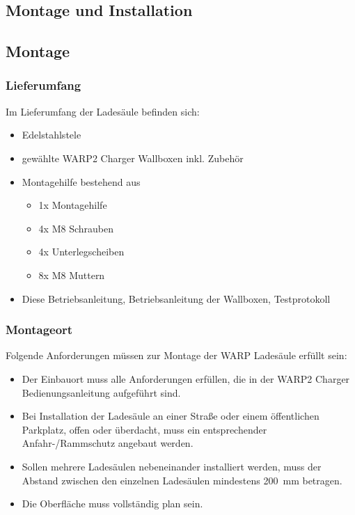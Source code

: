 \documentclass[a4paper,10pt]{article}
\begin{document}
\begin{multicols*}{2}
	\section{Montage und Installation}
	\subsection{Montage}
	\subsubsection{Lieferumfang}
	Im Lieferumfang der Ladesäule befinden sich:
	\begin{itemize}
		\item Edelstahlstele
		\item gewählte WARP2 Charger Wallboxen inkl. Zubehör
		\item Montagehilfe bestehend aus
			\begin{itemize}
				\item 1x Montagehilfe
				\item 4x M8 Schrauben
				\item 4x Unterlegscheiben
				\item 8x M8 Muttern
			\end{itemize}
		\item Diese Betriebsanleitung, Betriebsanleitung der Wallboxen,
		Testprotokoll
	\end{itemize}
\vspace{-0.1cm}
	\subsubsection{Montageort}
	Folgende Anforderungen müssen zur Montage der WARP Ladesäule erfüllt sein:
	\begin{itemize}
		\item Der Einbauort muss alle Anforderungen erfüllen, die in der
		WARP2 Charger Bedienungsanleitung aufgeführt sind.
		\item Bei Installation der Ladesäule an einer Straße oder einem
		öffentlichen Parkplatz, offen oder überdacht, muss ein entsprechender
		Anfahr-/Rammschutz angebaut werden.
		\item Sollen mehrere Ladesäulen nebeneinander installiert werden, muss
		der Abstand zwischen den einzelnen Ladesäulen mindestens \SI{200}{\milli\meter} betragen.
		\item Die Oberfläche muss vollständig plan sein.
	\end{itemize}


\end{multicols*}
\end{document}
